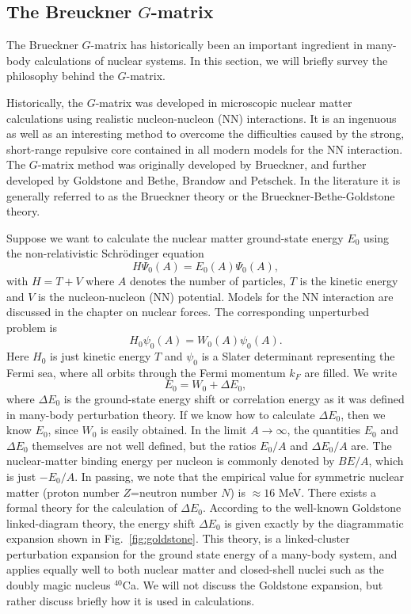\subsection{The Breuckner $G$-matrix}

The Brueckner $G$-matrix has historically been an important ingredient
in many-body calculations of nuclear systems. In this section, we will
briefly survey the philosophy behind the $G$-matrix.

Historically, the $G$-matrix was developed in microscopic nuclear
matter calculations using realistic nucleon-nucleon (NN) interactions.
It is an ingenuous as well as an interesting method to overcome the
difficulties caused by the strong, short-range repulsive core contained
in all modern models for the NN interaction. The $G$-matrix method was
originally developed by Brueckner, and further
developed by Goldstone and Bethe, Brandow and Petschek. 
In the literature it is generally referred to as the
Brueckner theory or the Brueckner-Bethe-Goldstone theory.

Suppose we want to calculate the nuclear matter ground-state
energy $E_0$ using the non-relativistic Schr\"{o}dinger equation
\begin{equation}
      H\Psi_0(A)=E_0(A)\Psi_0(A),
\end{equation}
with $H=T+V$ where $A$ denotes the number of particles, $T$
is the kinetic energy and $V$ is
the nucleon-nucleon
(NN)  potential. Models for the NN interaction are discussed in the chapter on nuclear forces.
The corresponding unperturbed
problem is
\begin{equation}
      H_0\psi_0(A)=W_0(A)\psi_0(A).
\end{equation}
Here $H_0$ is just kinetic energy $T$ and $\psi_0$ is a Slater
determinant representing the Fermi sea, where all orbits through the
Fermi momentum $k_F$ are filled. We write
\begin{equation}
      E_0=W_0+\Delta E_0,
\end{equation}
where $\Delta E_0$ is the ground-state energy shift or correlation energy as it was defined in many-body perturbation theory.
If we know how to calculate $\Delta E_0$, then we know $E_0$, since
$W_0$ is easily obtained. In the limit $A\rightarrow \infty$,
the quantities $E_0$ and $\Delta E_0$ themselves are not well
defined, but the ratios $E_0/A$ and $\Delta E_0/A$ are. The
nuclear-matter binding energy per nucleon is commonly denoted
by $BE/A$, which is just $-E_0/A$. In passing, we note that
the empirical value for symmetric nuclear matter (proton number
$Z$=neutron number $N$) is $\approx 16$ MeV.
There exists a formal theory for the calculation of $\Delta E_0$.
According to the well-known Goldstone linked-diagram theory, the energy shift $\Delta E_0$ is given exactly by the
diagrammatic expansion shown in Fig.~\ref{fig:goldstone}. This theory,
is a linked-cluster perturbation expansion for the ground state
energy of a many-body system, and applies equally well to both
nuclear matter and closed-shell nuclei such as the doubly magic
nucleus $^{40}$Ca. 
We will not discuss the Goldstone expansion, but rather discuss
briefly how it is used in calculations.


